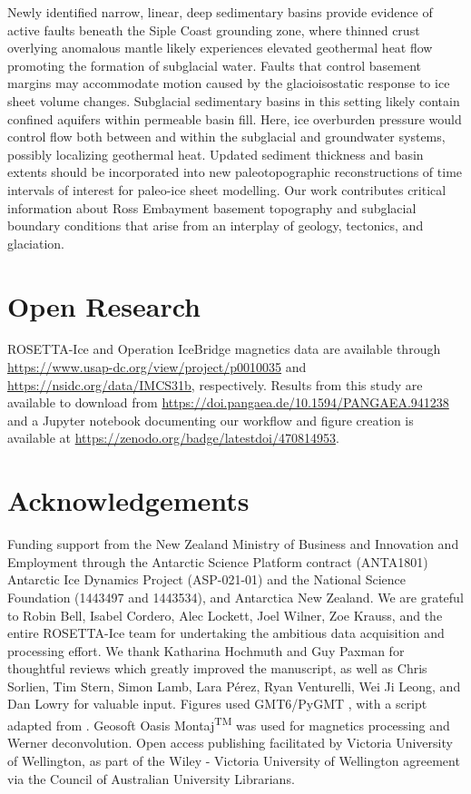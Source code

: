Newly identified narrow, linear, deep sedimentary basins provide evidence of active faults beneath the Siple Coast grounding zone, where thinned crust overlying anomalous mantle \citep{shencrust2018} likely experiences elevated geothermal heat flow promoting the formation of subglacial water. Faults that control basement margins may accommodate motion caused by the glacioisostatic response to ice sheet volume changes. Subglacial sedimentary basins in this setting likely contain confined aquifers within permeable basin fill. Here, ice overburden pressure would control flow both between and within the subglacial and groundwater systems, possibly localizing geothermal heat. Updated sediment thickness and basin extents should be incorporated into new paleotopographic reconstructions of time intervals of interest for paleo-ice sheet modelling. Our work contributes critical information about Ross Embayment basement topography and subglacial boundary conditions that arise from an interplay of geology, tectonics, and glaciation.


\section{Open Research}
ROSETTA-Ice and Operation IceBridge magnetics data are available through \url{https://www.usap-dc.org/view/project/p0010035} and \url{https://nsidc.org/data/IMCS31b}, respectively. Results from this study are available to download from \url{https://doi.pangaea.de/10.1594/PANGAEA.941238} and a Jupyter notebook documenting our workflow and figure creation is available at \url{https://zenodo.org/badge/latestdoi/470814953}.

\section{Acknowledgements}

Funding support from the New Zealand Ministry of Business and Innovation and Employment through the Antarctic Science Platform contract (ANTA1801) Antarctic Ice Dynamics Project (ASP-021-01) and the National Science Foundation (1443497 and 1443534), and Antarctica New Zealand. We are grateful to Robin Bell, Isabel Cordero, Alec Lockett, Joel Wilner, Zoe Krauss, and the entire ROSETTA-Ice team for undertaking the ambitious data acquisition and processing effort. We thank Katharina Hochmuth and Guy Paxman for thoughtful reviews which greatly improved the manuscript, as well as Chris Sorlien, Tim Stern, Simon Lamb, Lara Pérez, Ryan Venturelli, Wei Ji Leong, and Dan Lowry for valuable input. Figures used GMT6/PyGMT \citep{wesselgeneric2019, uiedapygmt2021}, with a script adapted from \citet{venturellimid2020}. Geosoft Oasis Montaj\textsuperscript{TM} was used for magnetics processing and Werner deconvolution. Open access publishing facilitated by Victoria University of Wellington, as part of the Wiley - Victoria University of Wellington agreement via the Council of Australian University Librarians. \\

